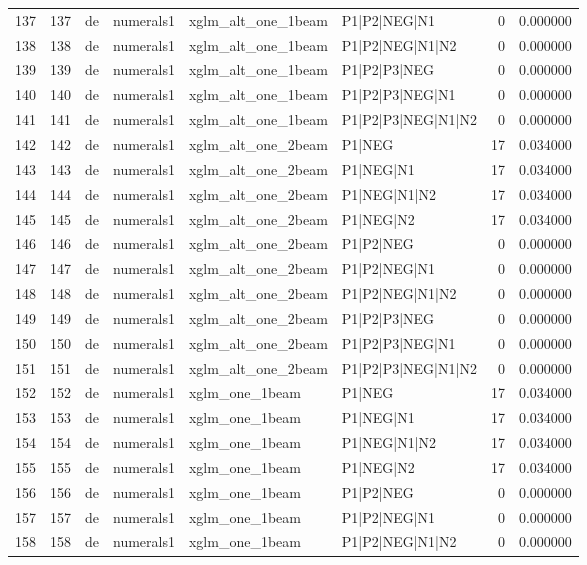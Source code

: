 \begin{tabular}{lrllllrr}
137 & 137 & de & numerals1 & xglm_alt_one_1beam & P1|P2|NEG|N1 & 0 & 0.000000 \\
138 & 138 & de & numerals1 & xglm_alt_one_1beam & P1|P2|NEG|N1|N2 & 0 & 0.000000 \\
139 & 139 & de & numerals1 & xglm_alt_one_1beam & P1|P2|P3|NEG & 0 & 0.000000 \\
140 & 140 & de & numerals1 & xglm_alt_one_1beam & P1|P2|P3|NEG|N1 & 0 & 0.000000 \\
141 & 141 & de & numerals1 & xglm_alt_one_1beam & P1|P2|P3|NEG|N1|N2 & 0 & 0.000000 \\
142 & 142 & de & numerals1 & xglm_alt_one_2beam & P1|NEG & 17 & 0.034000 \\
143 & 143 & de & numerals1 & xglm_alt_one_2beam & P1|NEG|N1 & 17 & 0.034000 \\
144 & 144 & de & numerals1 & xglm_alt_one_2beam & P1|NEG|N1|N2 & 17 & 0.034000 \\
145 & 145 & de & numerals1 & xglm_alt_one_2beam & P1|NEG|N2 & 17 & 0.034000 \\
146 & 146 & de & numerals1 & xglm_alt_one_2beam & P1|P2|NEG & 0 & 0.000000 \\
147 & 147 & de & numerals1 & xglm_alt_one_2beam & P1|P2|NEG|N1 & 0 & 0.000000 \\
148 & 148 & de & numerals1 & xglm_alt_one_2beam & P1|P2|NEG|N1|N2 & 0 & 0.000000 \\
149 & 149 & de & numerals1 & xglm_alt_one_2beam & P1|P2|P3|NEG & 0 & 0.000000 \\
150 & 150 & de & numerals1 & xglm_alt_one_2beam & P1|P2|P3|NEG|N1 & 0 & 0.000000 \\
151 & 151 & de & numerals1 & xglm_alt_one_2beam & P1|P2|P3|NEG|N1|N2 & 0 & 0.000000 \\
152 & 152 & de & numerals1 & xglm_one_1beam & P1|NEG & 17 & 0.034000 \\
153 & 153 & de & numerals1 & xglm_one_1beam & P1|NEG|N1 & 17 & 0.034000 \\
154 & 154 & de & numerals1 & xglm_one_1beam & P1|NEG|N1|N2 & 17 & 0.034000 \\
155 & 155 & de & numerals1 & xglm_one_1beam & P1|NEG|N2 & 17 & 0.034000 \\
156 & 156 & de & numerals1 & xglm_one_1beam & P1|P2|NEG & 0 & 0.000000 \\
157 & 157 & de & numerals1 & xglm_one_1beam & P1|P2|NEG|N1 & 0 & 0.000000 \\
158 & 158 & de & numerals1 & xglm_one_1beam & P1|P2|NEG|N1|N2 & 0 & 0.000000 \\

\end{tabular}
